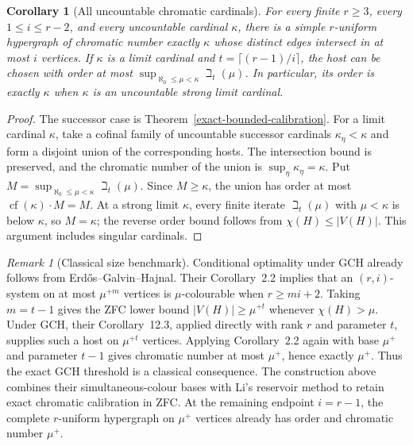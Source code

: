 \documentclass[a4paper,11pt,reqno]{amsart}
\theoremstyle{plain}
\newtheorem{corollary}[theorem]{Corollary}
\theoremstyle{definition}
\theoremstyle{remark}
\newtheorem{remark}[theorem]{Remark}
\begin{document}
\begin{corollary}[All uncountable chromatic cardinals]
\label{exact-all-cardinals}
For every finite $r\ge3$, every $1\le i\le r-2$, and every
uncountable cardinal $\kappa$, there is a simple $r$-uniform
hypergraph of chromatic number exactly $\kappa$ whose distinct
edges intersect in at most $i$ vertices.  If $\kappa$ is a limit
cardinal and $t=\lceil(r-1)/i\rceil$, the host can be chosen
with order at most $\sup_{\aleph_0\le\mu<\kappa}\beth_t(\mu)$.
In particular, its order is exactly $\kappa$ when $\kappa$ is
an uncountable strong limit cardinal.
\end{corollary}

\begin{proof}
The successor case is Theorem~\ref{exact-bounded-calibration}.
For a limit cardinal $\kappa$, take a cofinal family of uncountable
successor cardinals $\kappa_\eta<\kappa$ and form a disjoint union
of the corresponding hosts.  The intersection bound is preserved,
and the chromatic number of the union is
$\sup_\eta\kappa_\eta=\kappa$.
Put $M=\sup_{\aleph_0\le\mu<\kappa}\beth_t(\mu)$.  Since
$M\ge\kappa$, the union has order at most
$\operatorname{cf}(\kappa)\cdot M=M$.  At a strong limit
$\kappa$, every finite iterate $\beth_t(\mu)$ with $\mu<\kappa$
is below $\kappa$, so $M=\kappa$; the reverse order bound
follows from $\chi(H)\le|V(H)|$.
This argument includes singular cardinals.
\end{proof}

\begin{remark}[Classical size benchmark]
Conditional optimality under GCH already follows from
Erd\H{o}s--Galvin--Hajnal.  Their Corollary~2.2
\citep[p.~433]{egh1975} implies that an $(r,i)$-system on at most
$\mu^{+m}$ vertices is $\mu$-colourable when $r\ge mi+2$.
Taking $m=t-1$ gives the ZFC lower bound
$|V(H)|\ge\mu^{+t}$ whenever $\chi(H)>\mu$.
Under GCH, their Corollary~12.3, applied directly with rank $r$
and parameter $t$, supplies such a host on $\mu^{+t}$ vertices.
Applying Corollary~2.2 again with base $\mu^+$ and parameter
$t-1$ gives chromatic number at most $\mu^+$, hence exactly
$\mu^+$.  Thus the exact GCH threshold is a classical consequence.
The construction above combines their simultaneous-colour bases
with Li's reservoir method to retain exact chromatic calibration
in ZFC.  At the remaining endpoint $i=r-1$, the complete
$r$-uniform hypergraph on $\mu^+$ vertices already has order
and chromatic number $\mu^+$.
\end{remark}
\end{document}
